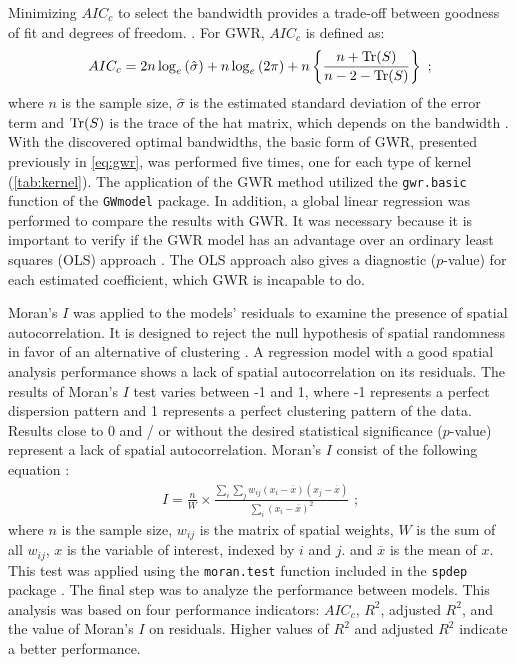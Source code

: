 Minimizing $AIC_c$ to select the bandwidth provides a trade-off between goodness of fit and degrees of freedom. \cite{Fotheringham2002}. For GWR, $AIC_c$ is defined as: \begin{align}
    AIC_c = 2n\log_{e}\left(\hat\sigma\right) + n \log_{e}\left(2\pi\right) + n\left\{\frac{n + \operatorname{Tr}(S)}{n - 2 - \operatorname{Tr}(S)}\right\} \mbox{ ;}
\end{align} where $n$ is the sample size, $\hat\sigma$ is the estimated standard deviation of the error term and $\operatorname{Tr}(S)$ is the trace of the hat matrix, which depends on the bandwidth \cite{Fotheringham2002}. With the discovered optimal bandwidths, the basic form of GWR, presented previously in \autoref{eq:gwr}, was performed five times, one for each type of kernel (\autoref{tab:kernel}). The application of the GWR method utilized the \verb|gwr.basic| function of the \verb|GWmodel| package. In addition, a global linear regression was performed to compare the results with GWR. It was necessary because it is important to verify if the GWR model has an advantage over an ordinary least squares (OLS) approach \cite{Brunsdon2010}. The OLS approach also gives a diagnostic ($p$-value) for each estimated coefficient, which GWR is incapable to do.

Moran's $I$ was applied to the models' residuals to examine the presence of spatial autocorrelation. It is designed to reject the null hypothesis of spatial randomness in favor of an alternative of clustering \cite{anselinLocalSpatialAutocorrelation2020}. A regression model with a good spatial analysis performance shows a lack of spatial autocorrelation on its residuals. The results of Moran's $I$ test varies between -1 and 1, where -1 represents a perfect dispersion pattern and 1 represents a perfect clustering pattern of the data. Results close to 0 and / or without the desired statistical significance ($p$-value) represent a lack of spatial autocorrelation. Moran's $I$ consist of the following equation \cite{Getis2010}: \begin{align}
    I = \frac{n}{W} \times \frac{\sum_i \sum_j w_{ij} (x_i - \overline{x})(x_j - \overline{x})}{\sum_i (x_i - \overline{x})^2} \mbox{ ;}
    \label{eq:global_moran}
\end{align} where $n$ is the sample size, $w_{ij}$ is the matrix of spatial weights, $W$ is the sum of all $w_{ij}$, $x$ is the variable of interest, indexed by $i$ and $j$. and $\overline{x}$ is the mean of $x$. This test was applied using the \verb|moran.test| function included in the \verb|spdep| package \cite{Bivand2013}. The final step was to analyze the performance between models. This analysis was based on four performance indicators: $AIC_c$, $R^2$, adjusted $R^2$, and the value of Moran's $I$ on residuals. Higher values of $R^2$ and adjusted $R^2$ indicate a better performance.

